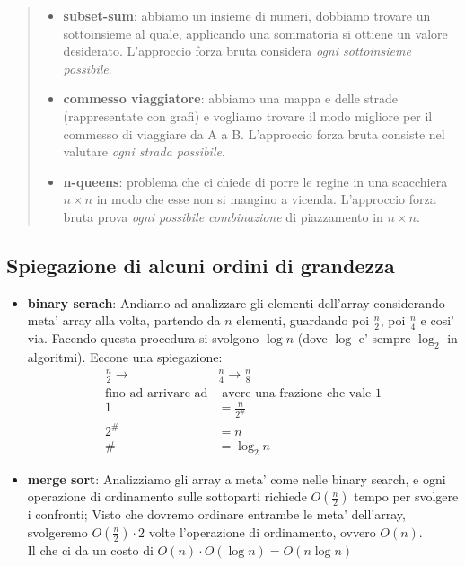 \documentclass{article}
\begin{document}
\begin{quote}
  \begin{itemize}
    \item \textbf{subset-sum}: abbiamo un insieme di numeri, dobbiamo trovare un sottoinsieme al quale, applicando
      una sommatoria si ottiene un valore desiderato. L'approccio forza bruta considera \emph{ogni sottoinsieme possibile}.
    \item \textbf{commesso viaggiatore}: abbiamo una mappa e delle strade (rappresentate con grafi) e vogliamo trovare il modo
      migliore per il commesso di viaggiare da A a B. L'approccio forza bruta consiste nel valutare \emph{ogni strada possibile}.
    \item \textbf{n-queens}: problema che ci chiede di porre le regine in una scacchiera $n \times n$ in modo
      che esse non si mangino a vicenda. L'approccio forza bruta prova \emph{ogni possibile combinazione} di piazzamento in $n \times n$.
  \end{itemize}
\end{quote}

\subsection{Spiegazione di alcuni ordini di grandezza}

\begin{itemize}
  \item \textbf{binary serach}: Andiamo ad analizzare gli elementi dell'array considerando meta' array alla volta,
    partendo da $n$ elementi, guardando poi $\frac{n}{2}$,  poi $\frac{n}{4}$ e cosi' via. Facendo questa procedura
    si svolgono $\log n$ (dove $\log$ e' sempre $\log_2$ in algoritmi). Eccone una spiegazione:
    \begin{align*}
      \frac{n}{2} \longrightarrow &\frac{n}{4} \longrightarrow \frac{n}{8} \\
      \text{fino ad arrivare ad} & \text{ avere una frazione che vale 1} \\
      1 &= \frac{n}{2^{\#}} \\
      2^{\#} &= n \\
      \# &= \log_2{n}
    \end{align*}

  \item \textbf{merge sort}: Analizziamo gli array a meta' come nelle binary
    search, e ogni operazione di ordinamento sulle sottoparti richiede $O(\frac{n}{2})$
    tempo per svolgere i confronti; Visto che dovremo ordinare entrambe le meta' dell'array,
    svolgeremo $O(\frac{n}{2}) \cdot 2$ volte l'operazione di ordinamento, ovvero $O(n)$. \\
    Il che ci da un costo di $O(n) \cdot O(\log n) = O(n \log n)$
\end{itemize}
\end{document}
